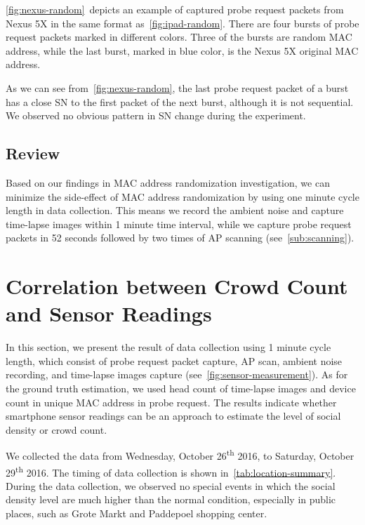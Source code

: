 	\autoref{fig:nexus-random}~depicts an example of captured probe request packets from Nexus 5X in the same format as~\autoref{fig:ipad-random}. There are four bursts of probe request packets marked in different colors. Three of the bursts are random \ac{MAC} address, while the last burst, marked in blue color, is the Nexus 5X original \ac{MAC} address.

	As we can see from~\autoref{fig:nexus-random}, the last probe request packet of a burst has a close \ac{SN} to the first packet of the next burst, although it is not sequential. We observed no obvious pattern in \ac{SN} change during the experiment.

	\subsection{Review} %
	\label{sub:review}
		Based on our findings in \ac{MAC} address randomization investigation, we can minimize the side-effect of \ac{MAC} address randomization by using one minute cycle length in data collection.
	This means we record the ambient noise and capture time-lapse images within 1 minute time interval, while we capture probe request packets in 52 seconds followed by two times of \ac{AP} scanning (see~\autoref{sub:scanning}).



\section{Correlation between Crowd Count and Sensor Readings} %
\label{sec:crowd_count_correlation-result}
In this section, we present the result of data collection using 1 minute cycle length, which consist of probe request packet capture, \ac{AP} scan, ambient noise recording, and time-lapse images capture (see~\autoref{fig:sensor-measurement}). As for the ground truth estimation, we used head count of time-lapse images and device count in unique \ac{MAC} address in probe request. The results indicate whether smartphone sensor readings can be an approach to estimate the level of social density or crowd count.

We collected the data from Wednesday, October 26\textsuperscript{th} 2016, to Saturday, October 29\textsuperscript{th} 2016. The timing of data collection is shown in~\autoref{tab:location-summary}. During the data collection, we observed no special events in which the social density level are much higher than the normal condition, especially in public places, such as Grote Markt and Paddepoel shopping center.

